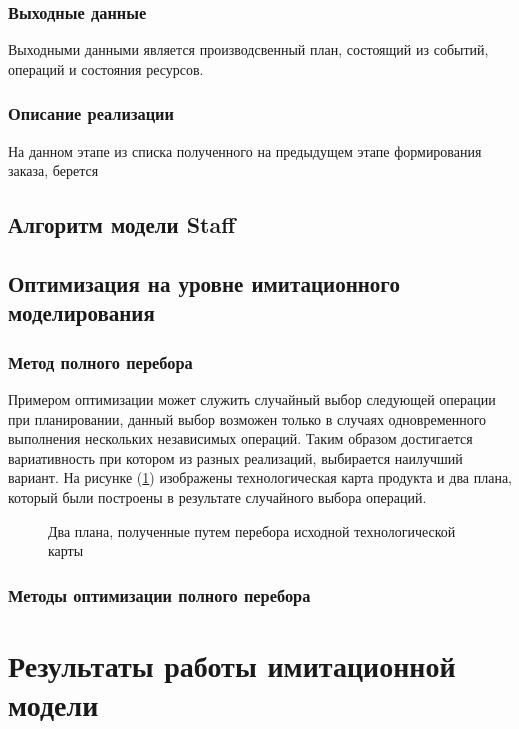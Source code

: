 \subsubsection{Выходные данные}
Выходными данными является производсвенный план, состоящий из событий, операций и состояния ресурсов.

\subsubsection{Описание реализации}
На данном этапе из списка полученного на предыдущем этапе формирования заказа, берется 

\subsection{Алгоритм модели Staff}

\subsection{Оптимизация на уровне имитационного моделирования}

\subsubsection{Метод полного перебора}
Примером оптимизации может служить случайный выбор следующей операции при планировании, данный выбор возможен только в случаях одновременного выполнения нескольких независимых операций. Таким образом достигается вариативность при котором из разных реализаций, выбирается наилучший вариант. На рисунке (\ref{ris:Force}) изображены технологическая карта продукта и два плана, который были построены в результате случайного выбора операций.

\begin{figure}[H]
    \caption{Два плана, полученные путем перебора исходной технологической карты}
    \label{ris:Force}
\end{figure}

\subsubsection{Методы оптимизации полного перебора}

\section{Результаты работы имитационной модели}